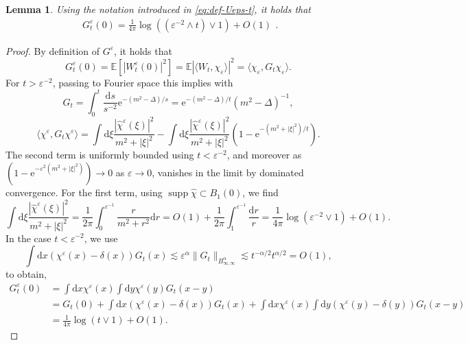 \documentclass[11pt, a4paper]{scrartcl}
\numberwithin{equation}{section}
\theoremstyle{plain}
\newtheorem{lemma}[foo]{Lemma}
\theoremstyle{remark}
\newcommand{\mathd}{\mathrm{d}}
\newcommand{\mathe}{\mathrm{e}}
\newcommand{\tmop}[1]{\ensuremath{\operatorname{#1}}}
\begin{document}
\begin{lemma}
	\label{lem:Geps}Using the notation introduced in \eqref{eq:def-Ueps-t}, it
	holds that
	\begin{equation}
		\begin{aligned}
			G_t^{\varepsilon} (0) = \frac{1}{4 \pi} \log ((\varepsilon^{- 2} \wedge
			t) \vee 1) + O (1)
		\end{aligned} . \label{eq:Geps-log}
	\end{equation}
\end{lemma}

\begin{proof}
	By definition of $G^{\varepsilon}$, it holds that
	\[ G_t^{\varepsilon} (0) =\mathbb{E} [| W_t^{\varepsilon} (0) |^2]
		=\mathbb{E} | \langle W_t, \chi_{\varepsilon} \rangle |^2 = \langle
		\chi_{\varepsilon}, G_t \chi_{\varepsilon} \rangle . \]
	For $t > \varepsilon^{- 2}$, passing to Fourier space this implies with \[G_t
		= \int_0^t \frac{\mathd s}{s^{- 2}} \mathe^{- (m^2 - \Delta) / s} =
		\mathe^{- (m^2 - \Delta) / t} (m^2 - \Delta)^{- 1},\]
	\[ \langle \chi^{\varepsilon}, G_t \chi^{\varepsilon} \rangle = \int \mathd
		\xi \frac{| \hat{\chi}^{\varepsilon} (\xi) |^2}{m^2 + | \xi |^2} - \int
		\mathd \xi \frac{| \hat{\chi}^{\varepsilon} (\xi) |^2}{m^2 + | \xi |^2}
		(1 - \mathe^{- (m^2 + | \xi |^2) / t}) . \]
	The second term is uniformly bounded using $t < \varepsilon^{- 2}$, and
	moreover as $(1 - \mathe^{- \varepsilon^2 (m^2 + | \xi |^2)}) \rightarrow 0$
	as $\varepsilon \rightarrow 0$, vanishes in the limit by dominated
	convergence. For the first term, using $\tmop{supp} \hat{\chi} \subset B_1
		(0)$, we find
	\[ \int \mathd \xi \frac{| \hat{\chi}^{\varepsilon} (\xi) |^2}{m^2 + | \xi
			|^2} = \frac{1}{2 \pi} \int_0^{\varepsilon^{- 1}} \frac{r}{m^2 + r^2}
		\mathd r = O (1) + \frac{1}{2 \pi} \int_1^{\varepsilon^{- 1}}
		\frac{\mathd r}{r} = \frac{1}{4 \pi} \log (\varepsilon^{- 2} \vee 1) + O
		(1) . \]
	In the case $t < \varepsilon^{- 2}$, we use
	\[ \int \mathd x (\chi^{\varepsilon} (x) - \delta (x)) G_t (x) \lesssim
		\varepsilon^{\alpha} \| G_t \|_{B^{\alpha}_{\infty, \infty}} \lesssim
		t^{- \alpha / 2} t^{\alpha / 2} = O (1), \]
	to obtain,
	\[ \begin{aligned}
			G_t^{\varepsilon} (0) & = \int \mathd x \chi^{\varepsilon} (x) \int
			\mathd y \chi^{\varepsilon} (y) G_t (x - y)                                             \\
			                      & = G_t (0) + \int \mathd x (\chi^{\varepsilon} (x) - \delta (x))
			G_t (x) + \int \mathd x \chi^{\varepsilon} (x) \int \mathd y
			(\chi^{\varepsilon} (y) - \delta (y)) G_t (x - y)                                       \\
			                      & = \frac{1}{4 \pi} \log (t \vee 1) + O (1) .
		\end{aligned} \]

\end{proof}
\end{document}
